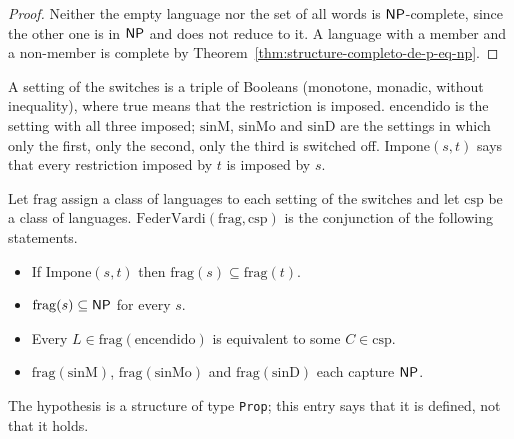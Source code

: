 \begin{proof}
  \leanok
  Neither the empty language nor the set of all words is $\mathsf{NP}$-complete, since the other one is in
  $\mathsf{NP}$ and does not reduce to it. A language with a member and a non-member is complete by
  Theorem~\ref{thm:structure-completo-de-p-eq-np}.
\end{proof}

\begin{definition}
  \label{def:structure-interruptores}
  \leanok
  A setting of the switches is a triple of Booleans (monotone, monadic, without inequality), where
  true means that the restriction is imposed. $\mathrm{encendido}$ is the setting with all three
  imposed; $\mathrm{sinM}$, $\mathrm{sinMo}$ and $\mathrm{sinD}$ are the settings in which only the
  first, only the second, only the third is switched off. $\mathrm{Impone}(s, t)$ says that every
  restriction imposed by $t$ is imposed by $s$.
  \own{}
\end{definition}

\begin{definition}
  \label{def:structure-feder-vardi}
  \leanok
  Let $\mathrm{frag}$ assign a class of languages to each setting of the switches and let $\mathrm{csp}$
  be a class of languages. $\mathrm{FederVardi}(\mathrm{frag}, \mathrm{csp})$ is the conjunction of
  the following statements.
  \begin{itemize}
    \item If $\mathrm{Impone}(s, t)$ then $\mathrm{frag}(s) \subseteq \mathrm{frag}(t)$.
    \item $\mathrm{frag}(s) \subseteq \mathsf{NP}$ for every $s$.
    \item Every $L \in \mathrm{frag}(\mathrm{encendido})$ is equivalent to some $C \in \mathrm{csp}$.
    \item $\mathrm{frag}(\mathrm{sinM})$, $\mathrm{frag}(\mathrm{sinMo})$ and $\mathrm{frag}(\mathrm{sinD})$
      each capture $\mathsf{NP}$.
  \end{itemize}
  The hypothesis is a structure of type \texttt{Prop}; this entry says that it is defined, not that it
  holds.
  \own{}
\end{definition}

